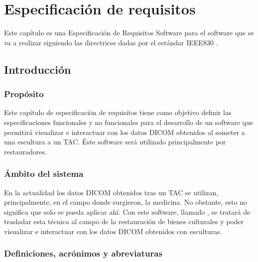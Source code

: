 \chapter{Especificación de requisitos}

Este capítulo es una Especificación de Requisitos Software para el software que se va a realizar siguiendo las directrices dadas por el estándar IEEE830 \cite{iee830}.

\section{Introducción}

\subsection{Propósito}

Este capítulo de especificación de requisitos tiene como objetivo definir las especificaciones funcionales y no funcionales para el desarrollo de un software que permitirá visualizar e interactuar con los datos DICOM obtenidos al someter a una escultura a un TAC. Éste software será utilizado principalmente por restauradores.

\subsection{Ámbito del sistema}

En la actualidad los datos DICOM obtenidos tras un TAC se utilizan, principalmente, en el campo donde surgieron, la medicina. No obstante, esto no significa que solo se pueda aplicar ahí. Con este software, llamado \myTitle, se tratará de trasladar esta técnica al campo de la restauración de bienes culturales y poder visualizar e interactuar con los datos DICOM obtenidos con esculturas.

\subsection{Definiciones, acrónimos y abreviaturas}

